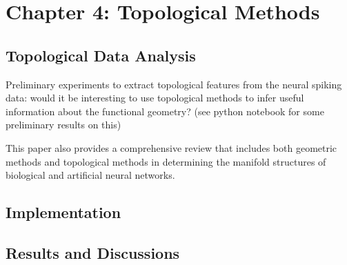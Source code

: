 \chapter{Chapter 4: Topological Methods}
\label{Chapter4} 

\section{Topological Data Analysis}
    
    Preliminary experiments to extract topological features from the neural spiking data: would it be interesting to use topological methods to infer useful information about the functional geometry? (see python notebook for some preliminary results on this)
    
    This paper \cite{chung_neural_2021} also provides a comprehensive review that includes both geometric methods and topological methods in determining the manifold structures of biological and artificial neural networks.

\section{Implementation}

\section{Results and Discussions}
